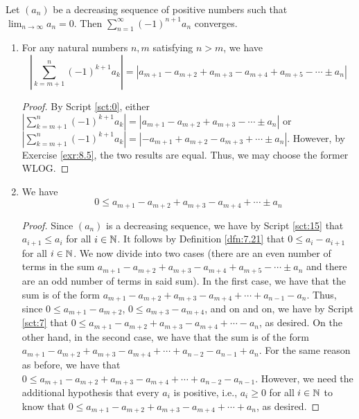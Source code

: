 \documentclass[../main.tex]{subfiles}
\begin{document}
\begin{theorem}\label{trm:16.12}
    Let $(a_n)$ be a decreasing sequence of positive numbers such that $\lim_{n\to\infty}a_n=0$. Then $\sum_{n=1}^\infty(-1)^{n+1}a_n$ converges.
            
    \begin{lemma*}\leavevmode
        \begin{enumerate}[label={\textup{(}\alph*\textup{)}}]
            \item For any natural numbers $n,m$ satisfying $n>m$, we have
            \begin{equation*}
                \left| \sum_{k=m+1}^n(-1)^{k+1}a_k \right| = |a_{m+1}-a_{m+2}+a_{m+3}-a_{m+4}+a_{m+5}-\cdots\pm a_n|
            \end{equation*}
            \begin{proof}
                By Script \ref{sct:0}, either $|\sum_{k=m+1}^n(-1)^{k+1}a_k|=|a_{m+1}-a_{m+2}+a_{m+3}-\cdots\pm a_n|$ or $|\sum_{k=m+1}^n(-1)^{k+1}a_k|=|-a_{m+1}+a_{m+2}-a_{m+3}+\cdots\pm a_n|$. However, by Exercise \ref{exr:8.5}, the two results are equal. Thus, we may choose the former WLOG.
            \end{proof}
            \item We have
            \begin{equation*}
                0 \leq a_{m+1}-a_{m+2}+a_{m+3}-a_{m+4}+\cdots\pm a_n
            \end{equation*}
            \begin{proof}
                Since $(a_n)$ is a decreasing sequence, we have by Script \ref{sct:15} that $a_{i+1}\leq a_i$ for all $i\in\mathbb{N}$. It follows by Definition \ref{dfn:7.21} that $0\leq a_i-a_{i+1}$ for all $i\in\mathbb{N}$. We now divide into two cases (there are an even number of terms in the sum $a_{m+1}-a_{m+2}+a_{m+3}-a_{m+4}+a_{m+5}-\cdots\pm a_n$ and there are an odd number of terms in said sum). In the first case, we have that the sum is of the form $a_{m+1}-a_{m+2}+a_{m+3}-a_{m+4}+\cdots+a_{n-1}-a_n$. Thus, since $0\leq a_{m+1}-a_{m+2}$, $0\leq a_{m+3}-a_{m+4}$, and on and on, we have by Script \ref{sct:7} that $0\leq a_{m+1}-a_{m+2}+a_{m+3}-a_{m+4}+\cdots-a_n$, as desired. On the other hand, in the second case, we have that the sum is of the form $a_{m+1}-a_{m+2}+a_{m+3}-a_{m+4}+\cdots+a_{n-2}-a_{n-1}+a_n$. For the same reason as before, we have that $0\leq a_{m+1}-a_{m+2}+a_{m+3}-a_{m+4}+\cdots+a_{n-2}-a_{n-1}$. However, we need the additional hypothesis that every $a_i$ is positive, i.e., $a_i\geq 0$ for all $i\in\mathbb{N}$ to know that $0\leq a_{m+1}-a_{m+2}+a_{m+3}-a_{m+4}+\cdots+a_n$, as desired.

\end{proof}
\end{enumerate}
\end{lemma*}
\end{theorem}
\end{document}
